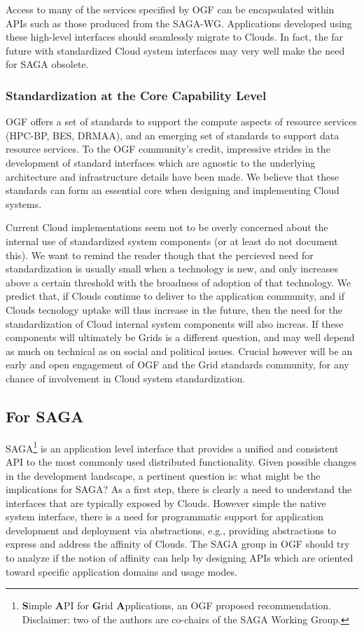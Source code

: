 \documentclass[conference,final]{IEEEtran}
\newcommand{\B}[1]{\textbf{#1}}
\begin{document}
   Access to many of the services specified by OGF can be encapsulated
   within APIs such as those produced from the SAGA-WG.  Applications
   developed using these high-level interfaces should seamlessly
   migrate to Clouds.  In fact, the far future with standardized Cloud
   system interfaces may very well make the need for SAGA obsolete.


  \subsubsection{Standardization at the Core Capability Level}

   OGF offers a set of standards to support the compute aspects of
   resource services (HPC-BP, BES, DRMAA), and an emerging set of
   standards to support data resource services.  To the OGF
   community's credit, impressive strides in the development of
   standard interfaces which are agnostic to the underlying
   architecture and infrastructure details have been made.  We believe
   that these standards can form an essential core when designing and
   implementing Cloud systems.

   Current Cloud implementations seem not to be overly concerned about
   the internal use of standardized system components (or at least do
   not document this).  We want to remind the reader though that the
   percieved need for standardization is usually small when a
   technology is new, and only increases above a certain threshold
   with the broadness of adoption of that technology.  We predict
   that, if Clouds continue to deliver to the application community,
   and if Clouds tecnology uptake will thus increase in the future,
   then the need for the standardization of Cloud internal system
   components will also increas.  If these components will ultimately
   be Grids is a different question, and may well depend as much on
   technical as on social and political issues.  Crucial however will
   be an early and open engagement of OGF and the Grid standards
   community, for any chance of involvement in Cloud system
   standardization.
  

 \subsection{For SAGA}

  SAGA\footnote{\B{S}imple \B{A}PI for \B{G}rid \B{A}pplications, an
  OGF proposed recommendation. Disclaimer: two of the authors are
  co-chairs of the SAGA Working Group.} is an application level
  interface that provides a unified and consistent API to the most
  commonly used distributed functionality.  Given possible changes in
  the development landscape, a pertinent question is: what might be
  the implications for SAGA? As a first step, there is clearly a need
  to understand the interfaces that are typically exposed by Clouds.
  However simple the native system interface, there is a need for
  programmatic support for application development and deployment via
  abstractions, e.g., providing abstractions to express and address
  the affinity of Clouds.  The SAGA group in OGF should try to analyze
  if the notion of affinity can help by designing APIs which are
  oriented toward specific application domains and usage modes.
\end{document}
